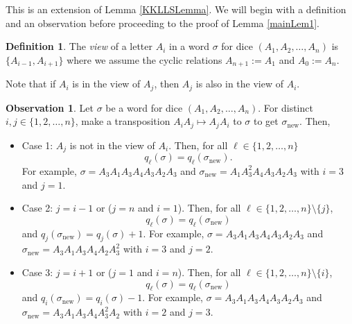 \documentclass[11pt]{article}
\theoremstyle{definition}
\newtheorem{defn}[theorem]{Definition}
\newtheorem{observation}[theorem]{Observation}
\begin{document}
This is an extension of Lemma \ref{KKLLSLemma}. We will begin with a definition and an observation before proceeding to the proof of Lemma \ref{mainLem1}.
\begin{defn}
    The \emph{view} of a letter $A_i$ in a word $\sigma$ for dice $(A_1,A_2,\dots,A_n)$ is $\{ A_{i-1},A_{i+1} \}$ where we assume the cyclic relations $A_{n+1} := A_1$ and $A_{0} := A_n$.
\end{defn}
Note that if $A_i$ is in the view of $A_j$, then $A_j$ is also in the view of $A_i$.
\begin{observation} \label{TranspoObs}
    Let $\sigma$ be a word for dice $(A_1,A_2,\dots,A_n)$. For distinct $i,j \in \{ 1,2,\dots,n \}$, make a transposition $A_iA_j \mapsto A_jA_i$ to $\sigma$ to get $\sigma_{\text{new}}$. Then,
    \begin{itemize}
        \item Case 1: $A_j$ is not in the view of $A_i$. Then, for all $\ell \in \{ 1,2,\dots, n \}$
        $$q_\ell(\sigma) = q_\ell(\sigma_{\text{new}}).$$
        For example, $\sigma = A_3A_1A_3A_4A_3A_2A_3$ and $\sigma_\text{new} = A_1A_3^2A_4A_3A_2A_3$ with $i=3$ and $j=1$.
        \item Case 2: $j = i-1$ or ($j=n$ and $i=1$). Then, for all $\ell \in \{ 1,2,\dots,n\}\setminus \{j\}$,
        $$q_\ell(\sigma) = q_\ell(\sigma_\text{new})$$
        and $q_j(\sigma_\text{new}) = q_j(\sigma) + 1$.
        For example, $\sigma = A_3A_1A_3A_4A_3A_2A_3$ and $\sigma_{\text{new}} = A_3A_1A_3A_4A_2A_3^2$ with $i=3$ and $j=2$.
        \item Case 3: $j = i+1$ or ($j=1$ and $i=n$). Then, for all $\ell \in \{ 1,2,\dots,n\}\setminus \{i\}$,
        $$q_\ell(\sigma) = q_\ell(\sigma_\text{new})$$
        and $q_{i}(\sigma_\text{new}) = q_i(\sigma) - 1$. For example, $\sigma = A_3A_1A_3A_4A_3A_2A_3$ and $\sigma_\text{new} = A_3A_1A_3A_4A_3^2A_2$ with $i = 2$ and $j=3$.
    \end{itemize}
\end{observation}
\end{document}
